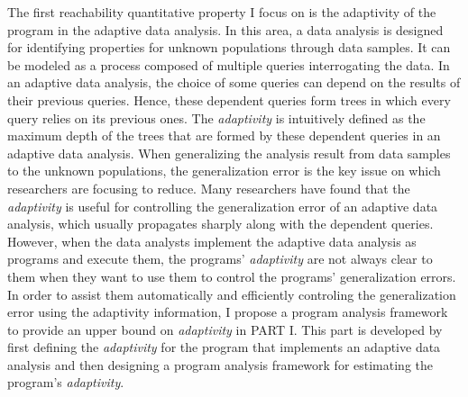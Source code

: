 The first reachability quantitative property
 I focus on is the adaptivity of the program in the adaptive data analysis.
 In this area, a data analysis is designed for identifying  properties for unknown populations 
 through data samples.
It can be modeled as a process composed of 
multiple queries interrogating the data.
 In an adaptive data analysis, the choice of some queries can depend on the results of their previous queries. 
 Hence, these dependent queries form trees in which every query relies on its previous ones.
The \emph{adaptivity} is intuitively defined as the maximum depth of the trees that are formed by these dependent queries
in an adaptive data analysis.
When generalizing the analysis result from data samples to the unknown populations, 
the generalization error is the key issue on which researchers are focusing to reduce.
 Many researchers have found that the
 \emph{adaptivity} is useful for controlling the generalization error of an adaptive data analysis,
 which usually propagates sharply along with the dependent queries. 
 However, when the data analysts implement the adaptive
 data analysis as programs and execute them,
the programs' \emph{adaptivity} are not always clear to them
when they want to use them to control the programs' generalization errors.
In order to assist them automatically and efficiently controling the generalization error using the adaptivity information,
 I propose a program analysis framework
 to provide an upper bound on \emph{adaptivity}
in PART I.
This part is developed by first defining the \emph{adaptivity} for 
 the program that implements an adaptive data analysis
 and then designing
 a program analysis framework for estimating the program's \emph{adaptivity}.

